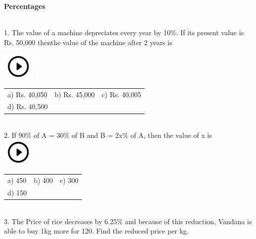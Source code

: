 \documentclass{article}
\begin{document}
\noindent \begin{center}
	{\Large \textbf{Percentages \\}}
\end{center}



\noindent 

\noindent \\


1.   The value of a machine depreciates every year by 10\%. If its present value is Rs. 50,000 thenthe value of the machine after 2 years is

\noindent  \includegraphics*[width=0.60in, height=0.52in]{images/image1} 


\begin{tabular}{p{1.7in} p{1.6in} p{1.6in}} \\ 
 a) Rs. 40,050             &    b) Rs. 45,000      &   c) Rs. 40,005        \\
d) Rs. 40,500  \\
\end{tabular}
                 

\noindent 

\noindent 

\noindent \\
 

2.   If 90\% of A = 30\% of B and B = 2x\% of A, then the value of x is  \\

\noindent \includegraphics*[width=0.60in, height=0.52in]{images/image1}  
\begin{tabular}{p{1.7in} p{1.6in} p{1.6in}} \\ 
	a) 450              &     b) 400         &     c) 300            \\
	 d) 150  \\
\end{tabular}
                                              

\noindent 

\noindent \\
3.   The Price of rice decreases by 6.25\% and because of this reduction, Vandana is able to buy 1kg more for 120. Find the reduced price per kg.
\end{document}
